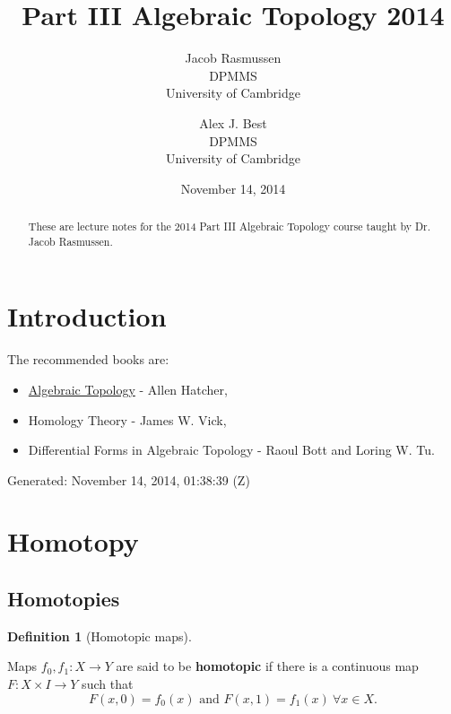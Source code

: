 \documentclass[10pt,]{article}
\title{Part III Algebraic Topology 2014}
\author{Jacob Rasmussen\\
DPMMS\\
University of Cambridge
\and
Alex J. Best\\
DPMMS\\
University of Cambridge
}
\date{November 14, 2014}
\newcommand{\terminology}[1]{\textbf{#1}}
\theoremstyle{plain}
\theoremstyle{definition}
\newtheorem{definition}[theorem]{Definition}
\begin{document}
\maketitle
\thispagestyle{empty}
\begin{abstract}

                    These are lecture notes for the 2014 Part III Algebraic Topology course taught by Dr. Jacob Rasmussen.
\end{abstract}
\setcounter{tocdepth}{1}
\renewcommand*\contentsname{Contents}
\tableofcontents
\clearpage
\typeout{************************************************}
\typeout{************************************************}
\section[Introduction]{Introduction}\label{section-1}
The recommended books are:
                \begin{itemize}
\item{}\href{http://www.math.cornell.edu/~hatcher/AT/ATpage.html}{Algebraic Topology} - Allen Hatcher,\item{}Homology Theory - James W. Vick,\item{}Differential Forms in Algebraic Topology - Raoul Bott and Loring W. Tu.\end{itemize}

\par
Generated: November 14, 2014, 01:38:39 (Z)%
\typeout{************************************************}
\typeout{************************************************}
\section[Homotopy]{Homotopy}\label{section-2}
\typeout{************************************************}
\typeout{************************************************}
\subsection[Homotopies]{Homotopies}\label{subsection-1}
\begin{definition}[Homotopic maps]\label{definition-1}

                        Maps \(f_0,f_1\colon X \to Y\) are said to be \terminology{homotopic} if there is a
                        continuous map \(F\colon X\times I \to Y\) such that
                        \[
                            F(x,0) = f_0(x)\text{ and }F(x,1) = f_1(x)\ \forall x\in X.
                        \]\end{definition}
\end{document}
